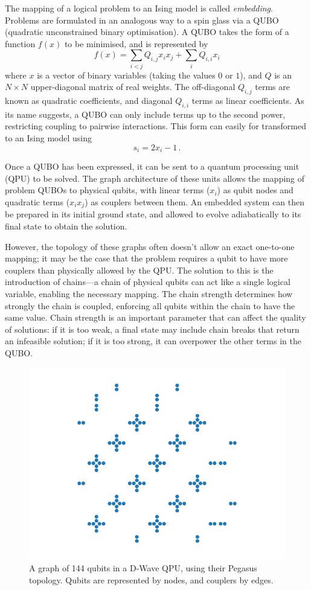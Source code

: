\documentclass[12pt]{article}
\begin{document}
The mapping of a logical problem to an Ising model is called \textit{embedding}. Problems are formulated in an analogous way to a spin glass via a QUBO (quadratic unconstrained binary optimisation). A QUBO takes the form of a function $f(x)$ to be minimised, and is represented by
\begin{equation}
    f(x)=\sum_{i<j}Q_{i,j}x_ix_j + \sum_iQ_{i,i}x_i
    \label{eq:QUBO}
\end{equation}
where $x$ is a vector of binary variables (taking the values $0$ or $1$), and $Q$ is an $N\times N$ upper-diagonal matrix of real weights. The off-diagonal $Q_{i,j}$ terms are known as quadratic coefficients, and diagonal $Q_{i,i}$ terms as linear coefficients. As its name suggests, a QUBO can only include terms up to the second power, restricting coupling to pairwise interactions.
This form can easily for transformed to an Ising model using
\begin{equation}
    s_i = 2x_i - 1 \,.
    \label{eq:qubo-ising}
\end{equation}

Once a QUBO has been expressed, it can be sent to a quantum processing unit (QPU) to be solved. The graph architecture of these units allows the mapping of problem QUBOs to physical qubits, with linear terms ($x_i$) as qubit nodes and quadratic terms ($x_ix_j$) as couplers between them. An embedded system can then be prepared in its initial ground state, and allowed to evolve adiabatically to its final state to obtain the solution.

However, the topology of these graphs often doesn't allow an exact one-to-one mapping; it may be the case that the problem requires a qubit to have more couplers than physically allowed by the QPU. The solution to this is the introduction of chains—a chain of physical qubits can act like a single logical variable, enabling the necessary mapping. The chain strength determines how strongly the chain is coupled, enforcing all qubits within the chain to have the same value. Chain strength is an important parameter that can affect the quality of solutions: if it is too weak, a final state may include chain breaks that return an infeasible solution; if it is too strong, it can overpower the other terms in the QUBO.

\begin{figure}[b]
    \centering
    \includegraphics[width=0.5\linewidth]{../Figures/pegasus.pdf}
    \caption{A graph of 144 qubits in a D-Wave QPU, using their Pegasus topology. Qubits are represented by nodes, and couplers by edges.}
    \label{fig:pegasus}
\end{figure}
\end{document}
